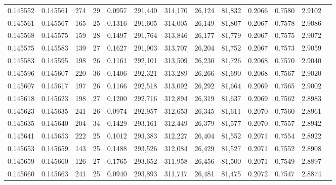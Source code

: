 \begin{tabular}{rrrrrrrrrrrrr}
0.145552 & 0.145561 & 274 &  29 &                                     0.0957 & 291,440 & 314,170 &  26,124 &  81,832 & 0.2066 & 0.7580 & 2.9102 \\
0.145561 & 0.145567 & 165 &  25 &                                     0.1316 & 291,605 & 314,005 &  26,149 &  81,807 & 0.2067 & 0.7578 & 2.9086 \\
0.145568 & 0.145575 & 159 &  28 &                                     0.1497 & 291,764 & 313,846 &  26,177 &  81,779 & 0.2067 & 0.7575 & 2.9072 \\
0.145575 & 0.145583 & 139 &  27 &                                     0.1627 & 291,903 & 313,707 &  26,204 &  81,752 & 0.2067 & 0.7573 & 2.9059 \\
0.145583 & 0.145595 & 198 &  26 &                                     0.1161 & 292,101 & 313,509 &  26,230 &  81,726 & 0.2068 & 0.7570 & 2.9040 \\
0.145596 & 0.145607 & 220 &  36 &                                     0.1406 & 292,321 & 313,289 &  26,266 &  81,690 & 0.2068 & 0.7567 & 2.9020 \\
0.145607 & 0.145617 & 197 &  26 &                                     0.1166 & 292,518 & 313,092 &  26,292 &  81,664 & 0.2069 & 0.7565 & 2.9002 \\
0.145618 & 0.145623 & 198 &  27 &                                     0.1200 & 292,716 & 312,894 &  26,319 &  81,637 & 0.2069 & 0.7562 & 2.8983 \\
0.145623 & 0.145635 & 241 &  26 &                                     0.0974 & 292,957 & 312,653 &  26,345 &  81,611 & 0.2070 & 0.7560 & 2.8961 \\
0.145635 & 0.145640 & 204 &  34 &                                     0.1429 & 293,161 & 312,449 &  26,379 &  81,577 & 0.2070 & 0.7557 & 2.8942 \\
0.145641 & 0.145653 & 222 &  25 &                                     0.1012 & 293,383 & 312,227 &  26,404 &  81,552 & 0.2071 & 0.7554 & 2.8922 \\
0.145653 & 0.145659 & 143 &  25 &                                     0.1488 & 293,526 & 312,084 &  26,429 &  81,527 & 0.2071 & 0.7552 & 2.8908 \\
0.145659 & 0.145660 & 126 &  27 &                                     0.1765 & 293,652 & 311,958 &  26,456 &  81,500 & 0.2071 & 0.7549 & 2.8897 \\
0.145660 & 0.145663 & 241 &  25 &                                     0.0940 & 293,893 & 311,717 &  26,481 &  81,475 & 0.2072 & 0.7547 & 2.8874 \\

\end{tabular}
